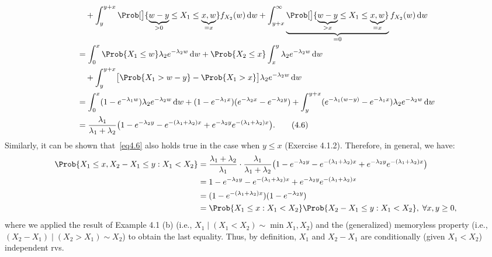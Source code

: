 \begin{Example}
\begin{align*}
         & \quad+\int_{y}^{y+x}\Prob[\big]{\underbrace{w-y}_{>0}\le X_1\le \underbrace{\min{x,w}}_{=x}}f_{X_2}(w)\odif{w}+\int_{y+x}^{\infty}\underbrace{\Prob[\big]{\underbrace{w-y}_{>x}\le X_1\le \underbrace{\min{x,w}}_{=x}}}_{=0}f_{X_2}(w)\odif{w} \\
         & =\int_{0}^{x}\Prob{X_1\le w}\lambda_2 e^{-\lambda_2 w}\odif{w}+\Prob{X_2\le x}\int_{x}^{y}\lambda_2 e^{-\lambda_2 w}\odif{w}                                                                                                                   \\
         & \quad+\int_{y}^{y+x}\bigl[\Prob{X_1>w-y}-\Prob{X_1>x}\bigr]\lambda_2 e^{-\lambda_2 w}\odif{w}                                                                                                                                                  \\
         & =\int_{0}^{x}(1-e^{-\lambda_1 w})\lambda_2 e^{-\lambda_2 w}\odif{w}+(1-e^{-\lambda_1 x})(e^{-\lambda_2 x}-e^{-\lambda_2 y})+\int_{y}^{y+x}(e^{-\lambda_1(w-y)}-e^{-\lambda_1 x})\lambda_2 e^{-\lambda_2 w}\odif{w}                             \\
         & =\frac{\lambda_1}{\lambda_1+\lambda_2}\bigl(1-e^{-\lambda_2 y}-e^{-(\lambda_1+\lambda_2)x}+e^{-\lambda_2 y}e^{-(\lambda_1+\lambda_2)x}\bigr).\tag*{(4.6)}\label{eq4.6}
    \end{align*}
    Similarly, it can be shown that~\ref{eq4.6} also holds true in the case when $ y\le x $ (Exercise 4.1.2).
    Therefore, in general, we have:
    \begin{align*}
        \Prob{X_1\le x,X_2-X_1\le y\given X_1<X_2}
         & =\frac{\lambda_1+\lambda_2}{\lambda_1}\cdot \frac{\lambda_1}{\lambda_1+\lambda_2}\bigl(1-e^{-\lambda_2 y}-e^{-(\lambda_1+\lambda_2)x}+e^{-\lambda_2 y}e^{-(\lambda_1+\lambda_2)x}\bigr) \\
         & =1-e^{-\lambda_2 y}-e^{-(\lambda_1+\lambda_2)x}+e^{-\lambda_2 y}e^{-(\lambda_1+\lambda_2)x}                                                                                             \\
         & =(1-e^{-(\lambda_1+\lambda_2)x})(1-e^{-\lambda_2 y})                                                                                                                                    \\
         & =\Prob{X_1\le x\given X_1<X_2}\Prob{X_2-X_1\le y\given X_1<X_2},\;\forall x,y\ge 0,
    \end{align*}
    where we applied the result of Example 4.1 (b) (i.e., $ X_1\mid(X_1<X_2)\sim \min{X_1,X_2} $) and the (generalized) memoryless property
    (i.e., $ (X_2-X_1)\mid(X_2>X_1)\sim X_2 $) to obtain the last equality. Thus, by definition, $ X_1 $ and $ X_2-X_1 $
    are conditionally (given $ X_1<X_2 $) independent rvs.
\end{Example}
